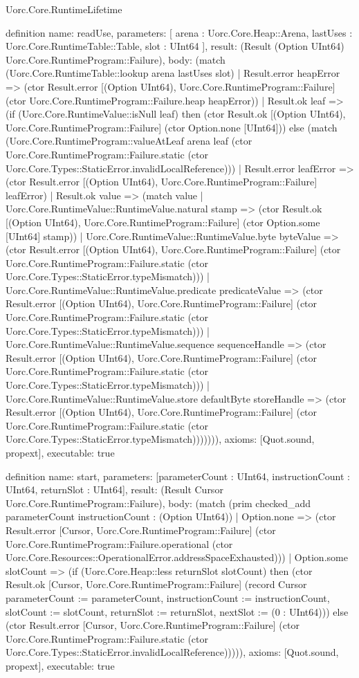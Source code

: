 \begin{lexlean}{Uorc.Core.RuntimeLifetime}
\begin{semanticmodule}
definition{
  name: readUse,
  parameters: [
    arena : Uorc.Core.Heap::Arena,
    lastUses : Uorc.Core.RuntimeTable::Table,
    slot : UInt64
  ],
  result: (Result (Option UInt64) Uorc.Core.RuntimeProgram::Failure),
  body: (match (Uorc.Core.RuntimeTable::lookup arena lastUses slot)
    | Result.error heapError => (ctor Result.error [(Option UInt64), Uorc.Core.RuntimeProgram::Failure] (ctor Uorc.Core.RuntimeProgram::Failure.heap heapError))
    | Result.ok leaf => (if (Uorc.Core.RuntimeValue::isNull leaf) then (ctor Result.ok [(Option UInt64), Uorc.Core.RuntimeProgram::Failure] (ctor Option.none [UInt64])) else (match (Uorc.Core.RuntimeProgram::valueAtLeaf arena leaf (ctor Uorc.Core.RuntimeProgram::Failure.static (ctor Uorc.Core.Types::StaticError.invalidLocalReference)))
      | Result.error leafError => (ctor Result.error [(Option UInt64), Uorc.Core.RuntimeProgram::Failure] leafError)
      | Result.ok value => (match value
        | Uorc.Core.RuntimeValue::RuntimeValue.natural stamp => (ctor Result.ok [(Option UInt64), Uorc.Core.RuntimeProgram::Failure] (ctor Option.some [UInt64] stamp))
        | Uorc.Core.RuntimeValue::RuntimeValue.byte byteValue => (ctor Result.error [(Option UInt64), Uorc.Core.RuntimeProgram::Failure] (ctor Uorc.Core.RuntimeProgram::Failure.static (ctor Uorc.Core.Types::StaticError.typeMismatch)))
        | Uorc.Core.RuntimeValue::RuntimeValue.predicate predicateValue => (ctor Result.error [(Option UInt64), Uorc.Core.RuntimeProgram::Failure] (ctor Uorc.Core.RuntimeProgram::Failure.static (ctor Uorc.Core.Types::StaticError.typeMismatch)))
        | Uorc.Core.RuntimeValue::RuntimeValue.sequence sequenceHandle => (ctor Result.error [(Option UInt64), Uorc.Core.RuntimeProgram::Failure] (ctor Uorc.Core.RuntimeProgram::Failure.static (ctor Uorc.Core.Types::StaticError.typeMismatch)))
        | Uorc.Core.RuntimeValue::RuntimeValue.store defaultByte storeHandle => (ctor Result.error [(Option UInt64), Uorc.Core.RuntimeProgram::Failure] (ctor Uorc.Core.RuntimeProgram::Failure.static (ctor Uorc.Core.Types::StaticError.typeMismatch))))))),
  axioms: [Quot.sound, propext],
  executable: true
}

definition{
  name: start,
  parameters: [parameterCount : UInt64, instructionCount : UInt64, returnSlot : UInt64],
  result: (Result Cursor Uorc.Core.RuntimeProgram::Failure),
  body: (match (prim checked_add parameterCount instructionCount : (Option UInt64))
    | Option.none => (ctor Result.error [Cursor, Uorc.Core.RuntimeProgram::Failure] (ctor Uorc.Core.RuntimeProgram::Failure.operational (ctor Uorc.Core.Resources::OperationalError.addressSpaceExhausted)))
    | Option.some slotCount => (if (Uorc.Core.Heap::less returnSlot slotCount) then (ctor Result.ok [Cursor, Uorc.Core.RuntimeProgram::Failure] (record Cursor {parameterCount := parameterCount, instructionCount := instructionCount, slotCount := slotCount, returnSlot := returnSlot, nextSlot := (0 : UInt64)})) else (ctor Result.error [Cursor, Uorc.Core.RuntimeProgram::Failure] (ctor Uorc.Core.RuntimeProgram::Failure.static (ctor Uorc.Core.Types::StaticError.invalidLocalReference))))),
  axioms: [Quot.sound, propext],
  executable: true
}


\end{semanticmodule}
\end{lexlean}
